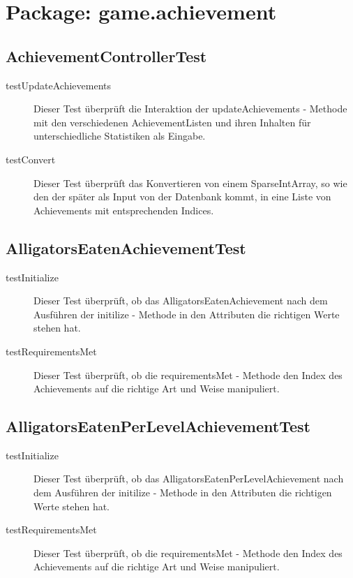 \section{Package: game.achievement}

\subsection{AchievementControllerTest}

\begin{description}

\item[testUpdateAchievements]
Dieser Test überprüft die Interaktion der updateAchievements - Methode mit den verschiedenen AchievementListen und ihren Inhalten für unterschiedliche Statistiken als Eingabe. 

\item[testConvert]
Dieser Test überprüft das Konvertieren von einem SparseIntArray, so wie den der später als Input von der Datenbank kommt, in eine Liste von Achievements mit entsprechenden Indices.

\end{description}

\subsection{AlligatorsEatenAchievementTest}

\begin{description}
\item[testInitialize]
Dieser Test überprüft, ob das AlligatorsEatenAchievement nach dem Ausführen der initilize - Methode in den Attributen die richtigen Werte stehen hat.

\item[testRequirementsMet]
Dieser Test überprüft, ob die requirementsMet - Methode den Index des Achievements auf die richtige Art und Weise manipuliert.

\end{description}

\subsection{AlligatorsEatenPerLevelAchievementTest}

\begin{description}
\item[testInitialize]
Dieser Test überprüft, ob das AlligatorsEatenPerLevelAchievement nach dem Ausführen der initilize - Methode in den Attributen die richtigen Werte stehen hat.

\item[testRequirementsMet]
Dieser Test überprüft, ob die requirementsMet - Methode den Index des Achievements auf die richtige Art und Weise manipuliert.

\end{description}

